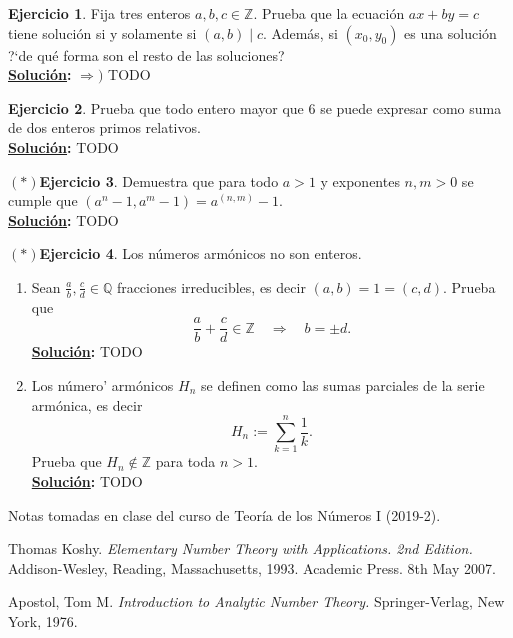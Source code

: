 \documentclass[11pt,letterpaper]{article}
\theoremstyle{definition}\newtheorem{p}{Ejercicio}
\theoremstyle{definition}\newtheorem{pp}[p]{$(*)$Ejercicio}
\numberwithin{p}{section}
\newcommand{\Z}{\mathbb{Z}}
\newcommand{\Q}{\mathbb{Q}}
\newcommand{\ent}{\Longrightarrow}
\newcommand{\sol}{\textbf{\underline{Solución}: }} %
\begin{document}
\begin{p}
  Fija tres enteros $a,b,c\in\Z$. Prueba que la ecuaci\'on $ax+by=c$ tiene soluci\'on si y solamente si $(a,b)\mid c$.
  Adem\'as, si $(x_0,y_0)$ es una soluci\'on ?`de qu\'e forma son el resto de las soluciones?\\
  \sol $\Rightarrow )$ TODO
  
\end{p}
%
\begin{p}
  Prueba que todo entero mayor que 6 se puede expresar como suma de dos enteros primos relativos.\\
  \sol TODO
\end{p}
%
\begin{pp}
  Demuestra que para todo $a>1$ y exponentes $n,m>0$ se cumple que $(a^n-1,a^m-1)=a^{(n,m)}-1$.\\
  \sol TODO
  
\end{pp}
%
\begin{pp}
  Los n\'umeros arm\'onicos no son enteros. 
  \begin{enumerate}
  \item Sean $\frac{a}{b},\frac{c}{d}\in\Q$ fracciones irreducibles, es decir $(a,b)=1=(c,d)$. Prueba que
    \[
      \frac{a}{b}+\frac{c}{d}\in\Z \quad\ent\quad b=\pm d.
    \]
    \sol TODO
  \item Los n\'umero' arm\'onicos $H_n$ se definen como las sumas parciales de la serie arm\'onica, es decir
  \[
    H_n:=\sum_{k=1}^n\frac{1}{k}.
  \]
  Prueba que $H_n\not\in\Z$ para toda $n>1$.\\
  \sol TODO
  \end{enumerate}
\end{pp}




\begin{thebibliography}{}

\bibitem{}
Notas tomadas en clase del curso de Teoría de los Números I (2019-2).

\bibitem{} 
Thomas Koshy. 
\textit{Elementary Number Theory with Applications. 2nd Edition.}
Addison-Wesley, Reading, Massachusetts, 1993.
Academic Press. 
8th May 2007.

\bibitem{}
Apostol, Tom M. 
\textit{Introduction to Analytic Number Theory.} 
Springer-Verlag, New York, 1976.

\end{thebibliography}
\end{document}
